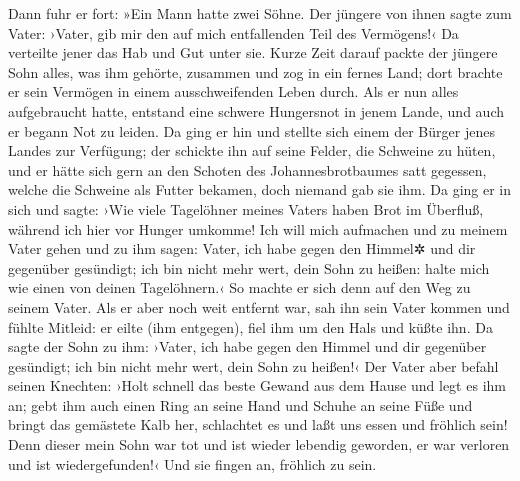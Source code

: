  Dann fuhr er fort: »Ein Mann hatte zwei Söhne.
 Der jüngere von ihnen sagte zum Vater: ›Vater, gib mir
den auf mich entfallenden Teil des Vermögens!‹ Da verteilte jener das
Hab und Gut unter sie.  Kurze Zeit darauf packte der
jüngere Sohn alles, was ihm gehörte, zusammen und zog in ein fernes
Land; dort brachte er sein Vermögen in einem ausschweifenden Leben
durch.  Als er nun alles aufgebraucht hatte, entstand
eine schwere Hungersnot in jenem Lande, und auch er begann Not zu
leiden.  Da ging er hin und stellte sich einem der Bürger
jenes Landes zur Verfügung; der schickte ihn auf seine Felder, die
Schweine zu hüten,  und er hätte sich gern an den Schoten
des Johannesbrotbaumes satt gegessen, welche die Schweine als Futter
bekamen, doch niemand gab sie ihm.  Da ging er in sich
und sagte: ›Wie viele Tagelöhner meines Vaters haben Brot im Überfluß,
während ich hier vor Hunger umkomme!  Ich will mich
aufmachen und zu meinem Vater gehen und zu ihm sagen: Vater, ich habe
gegen den Himmel✲ und dir gegenüber gesündigt;  ich bin
nicht mehr wert, dein Sohn zu heißen: halte mich wie einen von deinen
Tagelöhnern.‹  So machte er sich denn auf den Weg zu
seinem Vater. Als er aber noch weit entfernt war, sah ihn sein Vater
kommen und fühlte Mitleid: er eilte (ihm entgegen), fiel ihm um den Hals
und küßte ihn.  Da sagte der Sohn zu ihm: ›Vater, ich
habe gegen den Himmel und dir gegenüber gesündigt; ich bin nicht mehr
wert, dein Sohn zu heißen!‹  Der Vater aber befahl seinen
Knechten: ›Holt schnell das beste Gewand aus dem Hause und legt es ihm
an; gebt ihm auch einen Ring an seine Hand und Schuhe an seine Füße
 und bringt das gemästete Kalb her, schlachtet es und
laßt uns essen und fröhlich sein!  Denn dieser mein Sohn
war tot und ist wieder lebendig geworden, er war verloren und ist
wiedergefunden!‹ Und sie fingen an, fröhlich zu sein.

